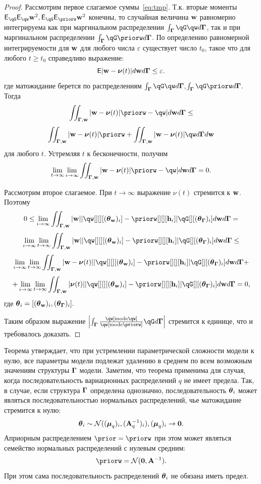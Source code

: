\begin{proof}
Рассмотрим первое слагаемое суммы~\eqref{eq:tmp}. Т.к. вторые моменты $\E_{\qG}\E_{\qw} \w^2, \E_{\qG}\E_{\priorw} \w^2$ конечны, то случайная величина $\mathbf{w}$ равномерно интегрируема как при маргинальном распределении $\int_{\G}\qG\qw d\G$, так и при маргинальном распределении $\int_{\G}\qG\priorw d\G$.
По определению равномерной интегрируемости для $\mathbf{w}$ для любого числа $\varepsilon$ существует число $t_0$, такое что для любого $t \geq t_0$ справедливо выражение:
\[
    \mathsf{E}|\mathbf{w} - \boldsymbol{\nu}(t)| d\mathbf{w} d\boldsymbol{\Gamma} \leq \varepsilon.
\]
где матожидание берется по  распределениям $\int_{\G}\qG\qw d\G$,$\int_{\G}\qG\priorw d\G$. Тогда
\[
   \iint_{\G,\w} |\w -\boldsymbol{\nu}(t)|\priorw  - \qw| d\w d\G   \leq  
\]
\[
  \iint_{\G,\w} |\w -\boldsymbol{\nu}(t)|\priorw  +   \iint_{\G,\w} |\w -\boldsymbol{\nu}(t)|\qw d\G d\w
\]
для любого $t$. Устремляя $t$ к бесконечности, получим $$\lim_{t \to \infty}  \lim_{i \to \infty}    \iint_{\G,\w} |\w -\boldsymbol{\nu}(t)|\priorw  - \qw| d\w d\G = 0.$$

Рассмотрим второе слагаемое.
При $t\to \infty$ выражение $\nu(t)$ стремится к $\mathbf{w}$.
Поэтому  
$$
0 \leq \lim_{i \to \infty} \iint_{\G,\w} |\w| |\qw[][][(\tetaw)_i] - \priorw[][][\h_i]|\qG[][(\tetaG)_i] d\w d\G = 
$$
\[
\lim_{i \to \infty}\lim_{t \to \infty} \iint_{\G,\w} |\w| |\qw[][][(\tetaw)_i] - \priorw[][][\h_i]|\qG[][(\tetaG)_i] d\w d\G \leq
\]
\[
  \lim_{i \to \infty}\lim_{t \to \infty}  \iint_{\G,\w} |\w -\boldsymbol{\nu}(t)| |\qw[][][(\tetaw)_i] - \priorw[][][\h_i]|\qG[][(\tetaG)_i] d\w d\G   + 
\]
\[
+   \lim_{i \to \infty}\lim_{t \to \infty}    \iint_{\G,\w} |\boldsymbol{\nu}(t)| |\qw[][][(\tetaw)_i] - \priorw[][][\h_i]|\qG[][(\tetaG)_i] d\w d\G =0,
\]
где $\boldsymbol{\theta}_i = [(\boldsymbol{\theta}_\mathbf{w})_i, (\boldsymbol{\theta}_{\boldsymbol{\Gamma}})_i].$

Таким образом выражение $\left|\int_{\G} \frac{\qw[\text{mode}\qw]}{\qw[\text{mode}\priorw]}\qG d\G \right|$ стремится к единице, что и требовалось доказать.
\end{proof}

Теорема утверждает, что при устремлении параметрической сложности модели к нулю, все параметры модели подлежат удалению в среднем по всем возможным значениям  структуры $\boldsymbol{\Gamma}$ модели. Заметим, что теорема применима для случая, когда последовательность вариационных распределений $q$ не имеет предела. Так, в случае, если структура $\boldsymbol{\Gamma}$ определена однозначно, последовательность $\boldsymbol{\theta}_i$ может являться последовательностью нормальных распределений, чье матожидание стремится к нулю:
\[
    \boldsymbol{\theta}_i \sim \mathcal{N}((\boldsymbol{\mu}_q)_i, (\mathbf{A}^{-1}_q)_i), (\boldsymbol{\mu}_q)_i \to \mathbf{0}.
\]
Априорным распределением $\prior = \priorw$ при этом может являться семейство нормальных распределений с нулевым средним:
\[
    \priorw = \mathcal{N}(\mathbf{0}, \A^{-1}).
\]
При этом сама последовательность распределений $\boldsymbol{\theta}_i$ не обязана иметь предел.

